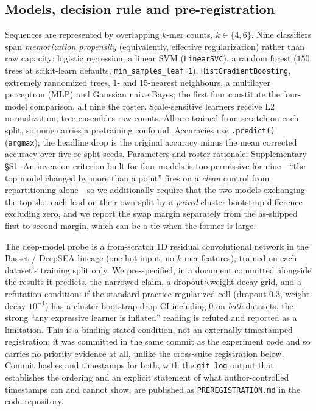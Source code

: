 \documentclass[webpdf,modern,large,namedate]{oup-authoring-template}%
\begin{document}
\subsection{Models, decision rule and pre-registration}\label{sec:m-models}
Sequences are represented by overlapping $k$-mer counts, $k\in\{4,6\}$. Nine classifiers span \emph{memorization propensity} (equivalently, effective regularization) rather than raw capacity: logistic regression, a linear SVM (\texttt{LinearSVC}), a random forest ($150$ trees at scikit-learn defaults, \texttt{min\_samples\_leaf=1}), \texttt{HistGradientBoosting}, extremely randomized trees, $1$- and $15$-nearest neighbours, a multilayer perceptron (MLP) and Gaussian naive Bayes; the first four constitute the four-model comparison, all nine the roster. Scale-sensitive learners receive L2 normalization, tree ensembles raw counts. All are trained from scratch on each split, so none carries a pretraining confound. Accuracies use \texttt{.predict()} (\texttt{argmax}); the headline drop is the original accuracy minus the mean corrected accuracy over five re-split seeds. Parameters and roster rationale: Supplementary \S S1. An inversion criterion built for four models is too permissive for nine---``the top model changed by more than a point'' fires on a \emph{clean} control from repartitioning alone---so we additionally require that the two models exchanging the top slot each lead on their own split by a \emph{paired} cluster-bootstrap difference excluding zero, and we report the swap margin separately from the as-shipped first-to-second margin, which can be a tie when the former is large.

The deep-model probe is a from-scratch 1D residual convolutional network in the Basset \citep{kelley2016basset} / DeepSEA \citep{zhou2015deepsea} lineage (one-hot input, no $k$-mer features), trained on each dataset's training split only. We pre-specified, in a document committed alongside the results it predicts, the narrowed claim, a dropout$\times$weight-decay grid, and a refutation condition: if the standard-practice regularized cell (dropout $0.3$, weight decay $10^{-4}$) has a cluster-bootstrap drop CI including $0$ on \emph{both} datasets, the strong ``any expressive learner is inflated'' reading is refuted and reported as a limitation. This is a binding stated condition, not an externally timestamped registration; it was committed in the same commit as the experiment code and so carries no priority evidence at all, unlike the cross-suite registration below. Commit hashes and timestamps for both, with the \texttt{git log} output that establishes the ordering and an explicit statement of what author-controlled timestamps can and cannot show, are published as \texttt{PREREGISTRATION.md} in the code repository.
\end{document}
